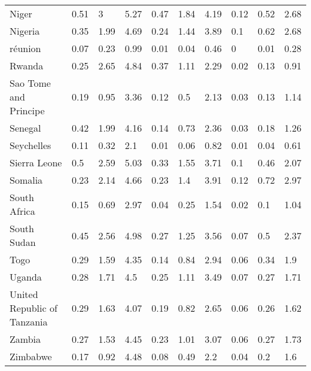 \begin{longtable}[t]{llllllllll}
Niger & 0.51 & 3 & 5.27 & 0.47 & 1.84 & 4.19 & 0.12 & 0.52 & 2.68\\
Nigeria & 0.35 & 1.99 & 4.69 & 0.24 & 1.44 & 3.89 & 0.1 & 0.62 & 2.68\\
réunion & 0.07 & 0.23 & 0.99 & 0.01 & 0.04 & 0.46 & 0 & 0.01 & 0.28\\
Rwanda & 0.25 & 2.65 & 4.84 & 0.37 & 1.11 & 2.29 & 0.02 & 0.13 & 0.91\\
Sao Tome and Principe & 0.19 & 0.95 & 3.36 & 0.12 & 0.5 & 2.13 & 0.03 & 0.13 & 1.14\\
Senegal & 0.42 & 1.99 & 4.16 & 0.14 & 0.73 & 2.36 & 0.03 & 0.18 & 1.26\\
Seychelles & 0.11 & 0.32 & 2.1 & 0.01 & 0.06 & 0.82 & 0.01 & 0.04 & 0.61\\
Sierra Leone & 0.5 & 2.59 & 5.03 & 0.33 & 1.55 & 3.71 & 0.1 & 0.46 & 2.07\\
Somalia & 0.23 & 2.14 & 4.66 & 0.23 & 1.4 & 3.91 & 0.12 & 0.72 & 2.97\\
South Africa & 0.15 & 0.69 & 2.97 & 0.04 & 0.25 & 1.54 & 0.02 & 0.1 & 1.04\\
South Sudan & 0.45 & 2.56 & 4.98 & 0.27 & 1.25 & 3.56 & 0.07 & 0.5 & 2.37\\
Togo & 0.29 & 1.59 & 4.35 & 0.14 & 0.84 & 2.94 & 0.06 & 0.34 & 1.9\\
Uganda & 0.28 & 1.71 & 4.5 & 0.25 & 1.11 & 3.49 & 0.07 & 0.27 & 1.71\\
United Republic of Tanzania & 0.29 & 1.63 & 4.07 & 0.19 & 0.82 & 2.65 & 0.06 & 0.26 & 1.62\\
Zambia & 0.27 & 1.53 & 4.45 & 0.23 & 1.01 & 3.07 & 0.06 & 0.27 & 1.73\\
Zimbabwe & 0.17 & 0.92 & 4.48 & 0.08 & 0.49 & 2.2 & 0.04 & 0.2 & 1.6\\*
\end{longtable}
\endgroup{}
